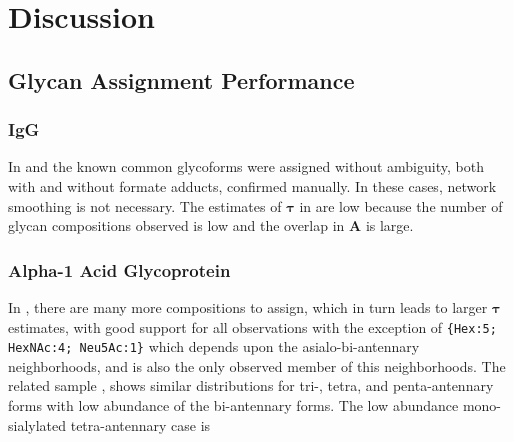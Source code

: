 \section{Discussion}

\subsection{Glycan Assignment Performance}

    \subsubsection{IgG}
        In \igg and \agp the known common glycoforms were assigned without ambiguity,
    both with and without formate adducts, confirmed manually. In these cases,
    network smoothing is not necessary. The estimates of $\mathbf{\tau}$ in \igg
    are low because the number of glycan compositions observed is low and the overlap
    in $\mathbf{A}$ is large.

    \subsubsection{Alpha-1 Acid Glycoprotein}
        In \agp, there are many more compositions to assign, which in turn leads to
    larger $\mathbf{\tau}$ estimates, with good support for all observations with the
    exception of \texttt{\{Hex:5; HexNAc:4; Neu5Ac:1\}} which depends upon the
    asialo-bi-antennary neighborhoods, and is also the only observed member of this
    neighborhoods. The related sample \dpagp, shows similar distributions for tri-,
    tetra, and penta-antennary forms with low abundance of the bi-antennary forms. The
    low abundance mono-sialylated tetra-antennary case is 



